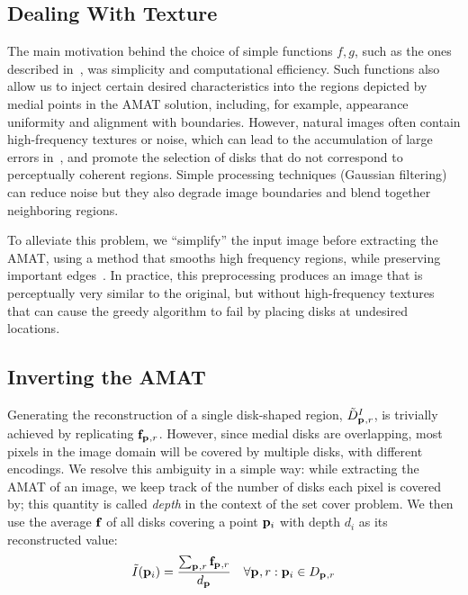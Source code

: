 \documentclass[10pt,twocolumn,letterpaper]{article}
\begin{document}
\subsection{Dealing With Texture}\label{sec:implementation:texture}
The main motivation behind the choice of simple functions $f,g$,
such as the ones described in~, was simplicity and  computational efficiency.
Such functions also allow us to inject certain desired characteristics into the regions depicted by medial points in the AMAT solution, 
including, for example, appearance uniformity and alignment with boundaries.
However, natural images often contain high-frequency textures or noise, which can lead to the accumulation of large errors 
in~, and promote the selection of disks that do not correspond to perceptually coherent regions. 
Simple processing techniques (\eg Gaussian filtering) can reduce noise but they also degrade image boundaries and
blend together neighboring regions.

To alleviate this problem, we ``simplify'' the input image before extracting the AMAT, using a method that smooths high frequency
regions, while preserving important edges~\cite{xu2011image}.
In practice, this preprocessing produces an image that is  perceptually very similar to the original, 
but without high-frequency textures that can cause the greedy algorithm to fail by placing disks at undesired locations.

\subsection{Inverting the AMAT}\label{sec:implementation:inverting}
Generating the reconstruction of a single disk-shaped region, $\tilde{D}_{\mathbf{p}_{},r}^I$, is trivially achieved by
replicating $\mathbf{f}_{\mathbf{p}_{},r}$.
However, since medial disks are overlapping, most pixels in the image domain will be covered by multiple disks,
with different encodings.
We resolve this ambiguity in a simple way: while extracting the AMAT of an image, we keep track of the
number of disks each pixel is covered by; this quantity is called \emph{depth} in the context of the set cover problem.
We then use the average $\mathbf{f}_{}$ of all disks covering a point $\mathbf{p}_{i}$ with depth $d_i$ as its reconstructed value:
\begin{equation}
\tilde{I}(\mathbf{p}_{i}) = \frac{\sum_{\mathbf{p}_{},r} \mathbf{f}_{\mathbf{p}_{},r}}{d_{\mathbf{p}_{}}} \quad \forall \mathbf{p}_{},r: \mathbf{p}_{i}\in D_{\mathbf{p}_{},r}
\label{eq:reconstruction}
\end{equation}
\end{document}
